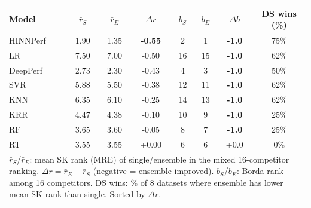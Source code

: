 \begin{tabular}{lccccccc}
\toprule
Model & $\bar{r}_S$ & $\bar{r}_E$ & $\Delta r$ & $b_S$ & $b_E$ & $\Delta b$ & DS wins (\%) \\
\midrule
HINNPerf & 1.90 & 1.35 & \textbf{-0.55} & 2 & 1 & \textbf{-1.0} & 75\% \\
LR & 7.50 & 7.00 & -0.50 & 16 & 15 & \textbf{-1.0} & 62\% \\
DeepPerf & 2.73 & 2.30 & -0.43 & 4 & 3 & \textbf{-1.0} & 50\% \\
SVR & 5.88 & 5.50 & -0.38 & 12 & 11 & \textbf{-1.0} & 62\% \\
KNN & 6.35 & 6.10 & -0.25 & 14 & 13 & \textbf{-1.0} & 62\% \\
KRR & 4.47 & 4.38 & -0.10 & 10 & 9 & \textbf{-1.0} & 25\% \\
RF & 3.65 & 3.60 & -0.05 & 8 & 7 & \textbf{-1.0} & 25\% \\
RT & 3.55 & 3.55 & +0.00 & 6 & 6 & +0.0 & 0\% \\
\bottomrule
\multicolumn{8}{l}{\footnotesize $\bar{r}_S$/$\bar{r}_E$: mean SK rank (MRE) of single/ensemble in the mixed 16-competitor ranking. $\Delta r = \bar{r}_E - \bar{r}_S$ (negative = ensemble improved). $b_S$/$b_E$: Borda rank among 16 competitors. DS wins: \% of 8 datasets where ensemble has lower mean SK rank than single. Sorted by $\Delta r$.} \\
\end{tabular}

